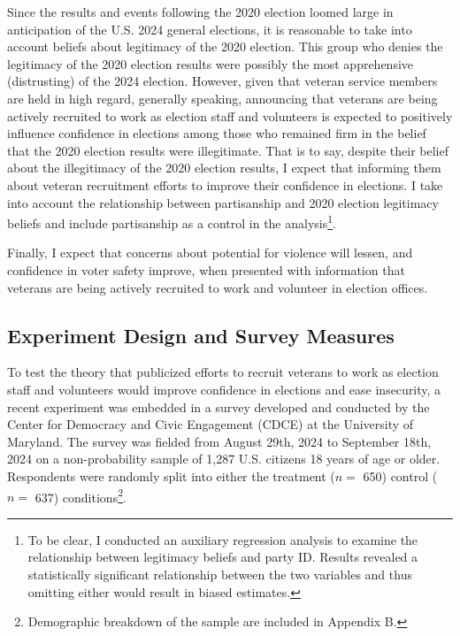 \documentclass[
  12pt,
  letterpaper,
]{article}
\begin{document}
Since the results and events following the 2020 election loomed large in
anticipation of the U.S. 2024 general elections, it is reasonable to
take into account beliefs about legitimacy of the 2020 election. This
group who denies the legitimacy of the 2020 election results were
possibly the most apprehensive (distrusting) of the 2024 election.
However, given that veteran service members are held in high regard,
generally speaking, announcing that veterans are being actively
recruited to work as election staff and volunteers is expected to
positively influence confidence in elections among those who remained
firm in the belief that the 2020 election results were illegitimate.
That is to say, despite their belief about the illegitimacy of the 2020
election results, I expect that informing them about veteran recruitment
efforts to improve their confidence in elections. I take into account
the relationship between partisanship and 2020 election legitimacy
beliefs and include partisanship as a control in the
analysis\footnote{To be clear, I conducted an auxiliary regression
  analysis to examine the relationship between legitimacy beliefs and
  party ID. Results revealed a statistically significant relationship
  between the two variables and thus omitting either would result in
  biased estimates.}.

Finally, I expect that concerns about potential for violence will
lessen, and confidence in voter safety improve, when presented with
information that veterans are being actively recruited to work and
volunteer in election offices.

\subsection{Experiment Design and Survey
Measures}\label{experiment-design-and-survey-measures}

To test the theory that publicized efforts to recruit veterans to work
as election staff and volunteers would improve confidence in elections
and ease insecurity, a recent experiment was embedded in a survey
developed and conducted by the Center for Democracy and Civic Engagement
(CDCE) at the University of Maryland. The survey was fielded from August
29th, 2024 to September 18th, 2024 on a non-probability sample of 1,287
U.S. citizens 18 years of age or older. Respondents were randomly split
into either the treatment (\(n =\) 650) control (\(n =\) 637)
conditions\footnote{Demographic breakdown of the sample are included in
  Appendix B.}.
\end{document}
